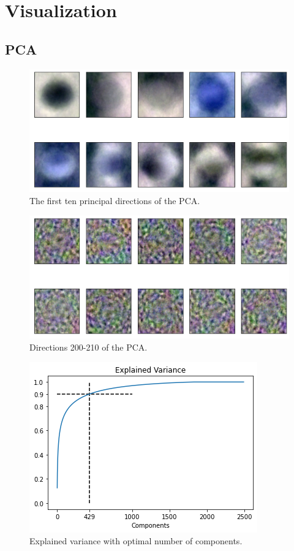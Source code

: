 \documentclass[aps,twocolumn,secnumarabic,nobalancelastpage,amsmath,amssymb,
nofootinbib]{revtex4}
\begin{document}
\section{Visualization}\label{visualization}

\subsection*{PCA}\label{pca}

\begin{figure}[h]
	\centering
	\includegraphics[width=0.7\linewidth]{Images/PCA1}
	\caption{The first ten principal directions of the PCA.}
	\label{fig:pca1}
\end{figure}
\begin{figure}[h]
	\centering
	\includegraphics[width=0.7\linewidth]{Images/PCA200}
	\caption{Directions 200-210 of the PCA.}
	\label{fig:pca200}
\end{figure}

\begin{figure}[h!]
	\centering
	\includegraphics[width=0.7\linewidth]{Images/ExplainedVariance90}
	\caption{Explained variance with optimal number of components.}
	\label{fig:explainedvariance90}
\end{figure}
\end{document}
